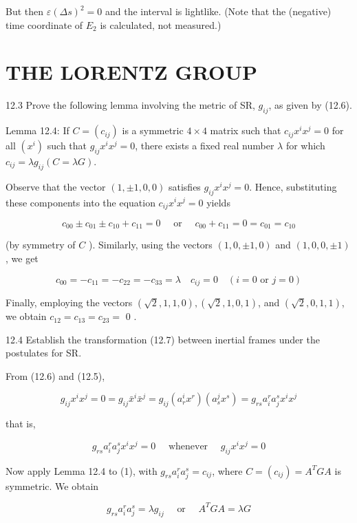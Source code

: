 \documentclass[10pt]{article}
\begin{document}
But then $\varepsilon(\Delta s)^{2}=0$ and the interval is lightlike. (Note that the (negative) time coordinate of $E_{2}$ is calculated, not measured.)

\section*{THE LORENTZ GROUP}
12.3 Prove the following lemma involving the metric of SR, $g_{i j}$, as given by (12.6).

Lemma 12.4: If $C=\left(c_{i j}\right)$ is a symmetric $4 \times 4$ matrix such that $c_{i j} x^{i} x^{j}=0$ for all $\left(x^{i}\right)$ such that $g_{i j} x^{i} x^{j}=0$, there exists a fixed real number $\lambda$ for which $c_{i j}=\lambda g_{i j}(C=\lambda G)$.

Observe that the vector $(1, \pm 1,0,0)$ satisfies $g_{i j} x^{i} x^{j}=0$. Hence, substituting these components into the equation $c_{i j} x^{i} x^{j}=0$ yields

$$
c_{00} \pm c_{01} \pm c_{10}+c_{11}=0 \quad \text { or } \quad c_{00}+c_{11}=0=c_{01}=c_{10}
$$

(by symmetry of $C$ ). Similarly, using the vectors $(1,0, \pm 1,0)$ and $(1,0,0, \pm 1)$, we get

$$
c_{00}=-c_{11}=-c_{22}=-c_{33}=\lambda \quad c_{i j}=0 \quad(i=0 \text { or } j=0)
$$

Finally, employing the vectors $(\sqrt{2}, 1,1,0),(\sqrt{2}, 1,0,1)$, and $(\sqrt{2}, 0,1,1)$, we obtain $c_{12}=c_{13}=c_{23}=$ 0 .

12.4 Establish the transformation (12.7) between inertial frames under the postulates for SR.

From (12.6) and (12.5),

$$
g_{i j} x^{i} x^{j}=0=g_{i j} \bar{x}^{i} \bar{x}^{j}=g_{i j}\left(a_{r}^{i} x^{r}\right)\left(a_{s}^{j} x^{s}\right)=g_{r s} a_{i}^{r} a_{j}^{s} x^{i} x^{j}
$$

that is,


\begin{equation*}
g_{r s} a_{i}^{r} a_{j}^{s} x^{i} x^{j}=0 \quad \text { whenever } \quad g_{i j} x^{i} x^{j}=0 \tag{1}
\end{equation*}


Now apply Lemma 12.4 to (1), with $g_{r s} a_{i}^{r} a_{j}^{s}=c_{i j}$, where $C=\left(c_{i j}\right)=A^{T} G A$ is symmetric. We obtain


\begin{equation*}
g_{r s} a_{i}^{r} a_{j}^{s}=\lambda g_{i j} \quad \text { or } \quad A^{T} G A=\lambda G \tag{2}
\end{equation*}
\end{document}
